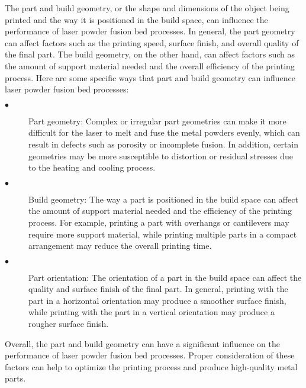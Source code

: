     The part and build geometry, or the shape and dimensions of the object being printed and the way it is positioned in the build space, can influence the performance of laser powder fusion bed processes. In general, the part geometry can affect factors such as the printing speed, surface finish, and overall quality of the final part. The build geometry, on the other hand, can affect factors such as the amount of support material needed and the overall efficiency of the printing process.
    Here are some specific ways that part and build geometry can influence laser powder fusion bed processes:
    \begin{description}
    \item[$\bullet$ ] Part geometry: Complex or irregular part geometries can make it more difficult for the laser to melt and fuse the metal powders evenly, which can result in defects such as porosity or incomplete fusion. In addition, certain geometries may be more susceptible to distortion or residual stresses due to the heating and cooling process.
    \item[$\bullet$ ] Build geometry: The way a part is positioned in the build space can affect the amount of support material needed and the efficiency of the printing process. For example, printing a part with overhangs or cantilevers may require more support material, while printing multiple parts in a compact arrangement may reduce the overall printing time.
    \item[$\bullet$ ] Part orientation: The orientation of a part in the build space can affect the quality and surface finish of the final part. In general, printing with the part in a horizontal orientation may produce a smoother surface finish, while printing with the part in a vertical orientation may produce a rougher surface finish.
    \end{description}
    Overall, the part and build geometry can have a significant influence on the performance of laser powder fusion bed processes. Proper consideration of these factors can help to optimize the printing process and produce high-quality metal parts.